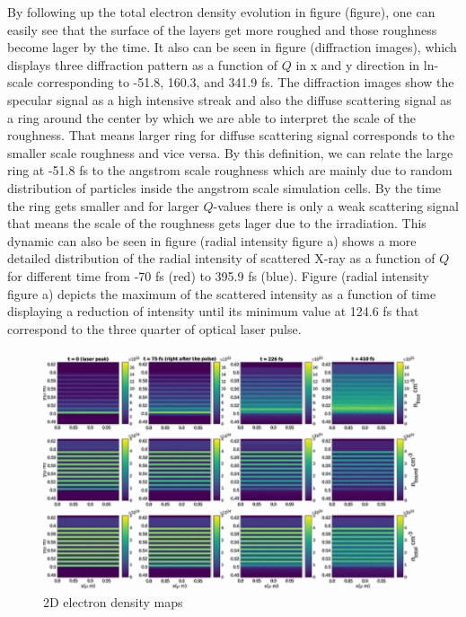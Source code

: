 \documentclass[preprint, 12pt]{elsarticle}
\begin{document}
By following up the total electron density evolution in figure (figure), one can
easily see that the surface of the layers get more roughed and those roughness
become lager by the time. It also can be seen in figure (diffraction images),
which displays three diffraction pattern as a function of $Q$ in x and y
direction in ln-scale corresponding to -51.8, 160.3, and 341.9 fs. The
diffraction images show the specular signal as a high intensive streak and also
the diffuse scattering signal as a ring around the center by which we are able
to interpret the scale of the roughness. That means larger ring for diffuse
scattering signal corresponds to the smaller scale roughness and vice versa. By
this definition, we can relate the large ring at -51.8 fs to the angstrom scale
roughness which are mainly due to random distribution of particles inside the
angstrom scale simulation cells. By the time the ring gets smaller and for
larger $Q$-values there is only a weak scattering signal that means the scale of
the roughness gets lager due to the irradiation. This dynamic can also be seen
in figure (radial intensity figure a) shows a more detailed distribution of the
radial intensity of scattered X-ray as a function of $Q$ for different time from
-70 fs (red) to 395.9 fs (blue). Figure (radial intensity figure a) depicts the
maximum of the scattered intensity as a function of time displaying a reduction
of intensity until its minimum value at 124.6 fs that correspond to the three
quarter of optical laser pulse.

\begin{figure}[h]
\centering\includegraphics[width=1.0\linewidth]{paper_plot.png}
\caption{2D electron density maps}
\end{figure}
\end{document}
